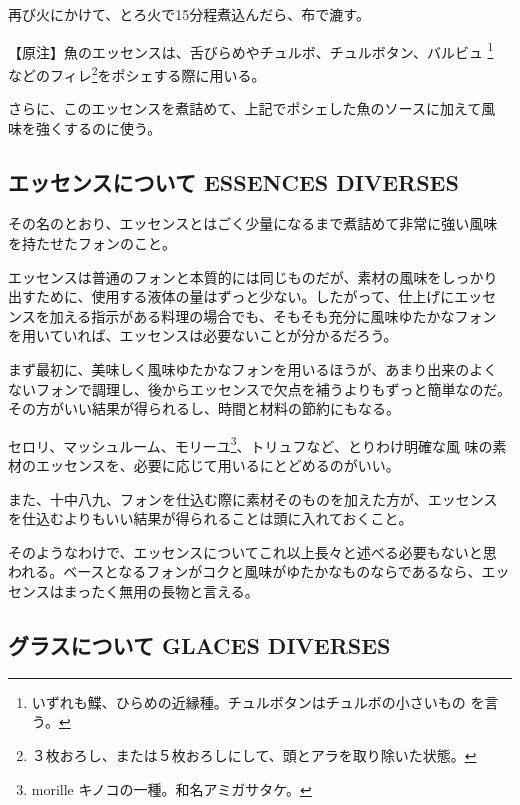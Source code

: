 \documentclass[twoside,12Q,b5paper]{escoffierltjsbook}
\begin{document}
再び火にかけて、とろ火で15分程煮込んだら、布で漉す。

【原注】魚のエッセンスは、舌びらめやチュルボ、チュルボタン、バルビュ
\footnote{いずれも鰈、ひらめの近縁種。チュルボタンはチュルボの小さいもの
  を言う。} などのフィレ\footnote{３枚おろし、または５枚おろしにして、頭とアラを取り除いた状態。}をポシェする際に用いる。

さらに、このエッセンスを煮詰めて、上記でポシェした魚のソースに加えて風
味を強くするのに使う。

\subsection*{エッセンスについて ESSENCES
DIVERSES}\label{ux30a8ux30c3ux30bbux30f3ux30b9ux306bux3064ux3044ux3066-essences-diverses}

その名のとおり、エッセンスとはごく少量になるまで煮詰めて非常に強い風味
を持たせたフォンのこと。

エッセンスは普通のフォンと本質的には同じものだが、素材の風味をしっかり
出すために、使用する液体の量はずっと少ない。したがって、仕上げにエッセ
ンスを加える指示がある料理の場合でも、そもそも充分に風味ゆたかなフォン
を用いていれば、エッセンスは必要ないことが分かるだろう。

まず最初に、美味しく風味ゆたかなフォンを用いるほうが、あまり出来のよく
ないフォンで調理し、後からエッセンスで欠点を補うよりもずっと簡単なのだ。
その方がいい結果が得られるし、時間と材料の節約にもなる。

セロリ、マッシュルーム、モリーユ\footnote{morille
  キノコの一種。和名アミガサタケ。}、トリュフなど、とりわけ明確な風
味の素材のエッセンスを、必要に応じて用いるにとどめるのがいい。

また、十中八九、フォンを仕込む際に素材そのものを加えた方が、エッセンス
を仕込むよりもいい結果が得られることは頭に入れておくこと。

そのようなわけで、エッセンスについてこれ以上長々と述べる必要もないと思
われる。ベースとなるフォンがコクと風味がゆたかなものならであるなら、エッ
センスはまったく無用の長物と言える。

\subsection*{グラスについて GLACES
DIVERSES}\label{ux30b0ux30e9ux30b9ux306bux3064ux3044ux3066-glaces-diverses}
\end{document}

